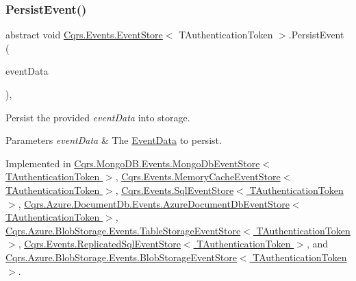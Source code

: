 \subsubsection{\texorpdfstring{Persist\+Event()}{PersistEvent()}}
{\footnotesize\ttfamily abstract void \hyperlink{classCqrs_1_1Events_1_1EventStore}{Cqrs.\+Events.\+Event\+Store}$<$ T\+Authentication\+Token $>$.Persist\+Event (\begin{DoxyParamCaption}\item[{\hyperlink{classCqrs_1_1Events_1_1EventData}{Event\+Data}}]{event\+Data }\end{DoxyParamCaption})\hspace{0.3cm}{\ttfamily [protected]}, {}}



Persist the provided {\itshape event\+Data}  into storage. 


\begin{DoxyParams}{Parameters}
{\em event\+Data} & The \hyperlink{classCqrs_1_1Events_1_1EventData}{Event\+Data} to persist.\\
\hline
\end{DoxyParams}


Implemented in \hyperlink{classCqrs_1_1MongoDB_1_1Events_1_1MongoDbEventStore_a13f6823671d7cb9c042d8f7156a51b89_a13f6823671d7cb9c042d8f7156a51b89}{Cqrs.\+Mongo\+D\+B.\+Events.\+Mongo\+Db\+Event\+Store$<$ T\+Authentication\+Token $>$}, \hyperlink{classCqrs_1_1Events_1_1MemoryCacheEventStore_a9b1a1aaab34770bd68ebcedca0fc40b0_a9b1a1aaab34770bd68ebcedca0fc40b0}{Cqrs.\+Events.\+Memory\+Cache\+Event\+Store$<$ T\+Authentication\+Token $>$}, \hyperlink{classCqrs_1_1Events_1_1SqlEventStore_a8d67570d50a97050cbce5a29d7a4b9f6_a8d67570d50a97050cbce5a29d7a4b9f6}{Cqrs.\+Events.\+Sql\+Event\+Store$<$ T\+Authentication\+Token $>$}, \hyperlink{classCqrs_1_1Azure_1_1DocumentDb_1_1Events_1_1AzureDocumentDbEventStore_afe494469614082cf667f5cf4b6c4a97b_afe494469614082cf667f5cf4b6c4a97b}{Cqrs.\+Azure.\+Document\+Db.\+Events.\+Azure\+Document\+Db\+Event\+Store$<$ T\+Authentication\+Token $>$}, \hyperlink{classCqrs_1_1Azure_1_1BlobStorage_1_1Events_1_1TableStorageEventStore_ae63921d0ace265b1b269c865080b5712_ae63921d0ace265b1b269c865080b5712}{Cqrs.\+Azure.\+Blob\+Storage.\+Events.\+Table\+Storage\+Event\+Store$<$ T\+Authentication\+Token $>$}, \hyperlink{classCqrs_1_1Events_1_1ReplicatedSqlEventStore_aedff93a62c275a18d45ede6576fe2840_aedff93a62c275a18d45ede6576fe2840}{Cqrs.\+Events.\+Replicated\+Sql\+Event\+Store$<$ T\+Authentication\+Token $>$}, and \hyperlink{classCqrs_1_1Azure_1_1BlobStorage_1_1Events_1_1BlobStorageEventStore_aa27a352076b8967498407d24814f7c83_aa27a352076b8967498407d24814f7c83}{Cqrs.\+Azure.\+Blob\+Storage.\+Events.\+Blob\+Storage\+Event\+Store$<$ T\+Authentication\+Token $>$}.

